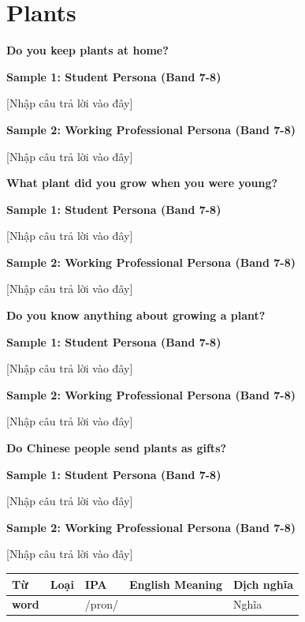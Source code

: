 \newpage

\section{Plants}
\begin{ieltsquestion}
\textbf{Do you keep plants at home?}
\end{ieltsquestion}
\textbf{Sample 1: Student Persona (Band 7-8)}

[Nhập câu trả lời vào đây]

\textbf{Sample 2: Working Professional Persona (Band 7-8)}

[Nhập câu trả lời vào đây]

\separator

\begin{ieltsquestion}
\textbf{What plant did you grow when you were young?}
\end{ieltsquestion}
\textbf{Sample 1: Student Persona (Band 7-8)}

[Nhập câu trả lời vào đây]

\textbf{Sample 2: Working Professional Persona (Band 7-8)}

[Nhập câu trả lời vào đây]

\separator

\begin{ieltsquestion}
\textbf{Do you know anything about growing a plant?}
\end{ieltsquestion}
\textbf{Sample 1: Student Persona (Band 7-8)}

[Nhập câu trả lời vào đây]

\textbf{Sample 2: Working Professional Persona (Band 7-8)}

[Nhập câu trả lời vào đây]

\separator

\begin{ieltsquestion}
\textbf{Do Chinese people send plants as gifts?}
\end{ieltsquestion}
\textbf{Sample 1: Student Persona (Band 7-8)}

[Nhập câu trả lời vào đây]

\textbf{Sample 2: Working Professional Persona (Band 7-8)}

[Nhập câu trả lời vào đây]

\separator


\vspace{0.8em}
\begin{center}
\renewcommand{\arraystretch}{1.65}
\begin{tabularx}{\textwidth}{|V{0.22\textwidth}|C{0.07\textwidth}|I{0.20\textwidth}|Y|V{0.18\textwidth}|}
\hline
{}
\textbf{Từ} & \textbf{Loại} & \textbf{IPA} & \textbf{English Meaning} & \textbf{Dịch nghĩa} \\
\hline
\textbf{word} &  & /pron/ &  & Nghĩa \\ \hline
\end{tabularx}
\end{center}

